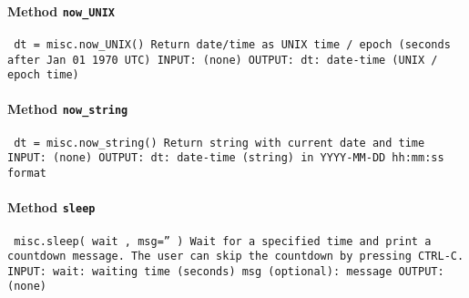 \paragraph{Method \texttt{now_UNIX}}
\vspace{1ex}
\texttt{\newline
dt = misc.now_UNIX()\newline
\newline
Return date/time as UNIX time / epoch (seconds after Jan 01 1970 UTC)\newline
\newline
INPUT:\newline
(none)\newline
\newline
OUTPUT:\newline
dt: date-time (UNIX / epoch time)\newline
\newline
}

\paragraph{Method \texttt{now_string}}
\vspace{1ex}
\texttt{\newline
dt = misc.now_string()\newline
\newline
Return string with current date and time\newline
\newline
INPUT:\newline
(none)\newline
\newline
OUTPUT:\newline
dt: date-time (string) in YYYY-MM-DD hh:mm:ss format\newline
\newline
}

\paragraph{Method \texttt{sleep}}
\vspace{1ex}
\texttt{\newline
misc.sleep( wait , msg='' )\newline
\newline
Wait for a specified time and print a countdown message. The user can skip the countdown by pressing CTRL-C.\newline
\newline
INPUT:\newline
wait: waiting time (seconds)\newline
msg (optional): message\newline
\newline
OUTPUT:\newline
(none)\newline
\newline
}


